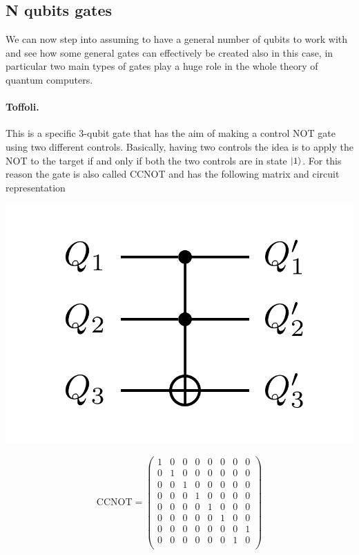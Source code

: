 \subsection{N qubits gates}

We can now step into assuming to have a general number of qubits to work with and see how some general gates can effectively be created also in this case, in particular two main types of gates play a huge role in the whole theory of quantum computers.

\paragraph{Toffoli.} This is a specific 3-qubit gate that has the aim of making a control NOT gate using two different controls. Basically, having two controls the idea is to apply the NOT to the target if and only if both the two controls are in state $\ket{1}$. For this reason the gate is also called CCNOT and has the following matrix and circuit representation

\begin{minipage}{0.45\textwidth}
    \centering
    \includegraphics[width=\textwidth]{Immagini/Toffoli.pdf}
\end{minipage}
\begin{minipage}{0.45\textwidth}
    \begin{displaymath}
        \text{CCNOT} = \begin{pmatrix}
            1 & 0 & 0 & 0 & 0 & 0 & 0 & 0\\
            0 & 1 & 0 & 0 & 0 & 0 & 0 & 0\\
            0 & 0 & 1 & 0 & 0 & 0 & 0 & 0\\
            0 & 0 & 0 & 1 & 0 & 0 & 0 & 0\\
            0 & 0 & 0 & 0 & 1 & 0 & 0 & 0\\
            0 & 0 & 0 & 0 & 0 & 1 & 0 & 0\\
            0 & 0 & 0 & 0 & 0 & 0 & 0 & 1\\
            0 & 0 & 0 & 0 & 0 & 0 & 1 & 0\\
        \end{pmatrix}
    \end{displaymath}
\end{minipage}

